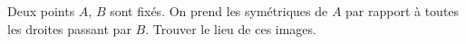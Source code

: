 Deux points $A$, $B$ sont fixés. On prend les symétriques de $A$ par rapport à toutes les droites passant par $B$. Trouver le lieu de ces images.
